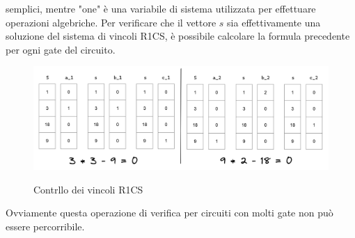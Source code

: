 
semplici, mentre "one" è una variabile di sistema utilizzata per effettuare operazioni algebriche. Per verificare
che il vettore $s$ sia effettivamente una soluzione del sistema di vincoli R1CS, è possibile calcolare la formula
precedente per ogni gate del circuito.

\begin{figure}[H]
    \centering
    \includegraphics[width=15cm]{./chapters/1.state-of-art/images/10.check_r1cs.png}
    \label{fig:check-r1cs}
    \captionsetup{justification=centering}
    \caption{Contrllo dei vincoli R1CS}
\end{figure}

Ovviamente questa operazione di verifica per circuiti con molti gate non può essere percorribile.

